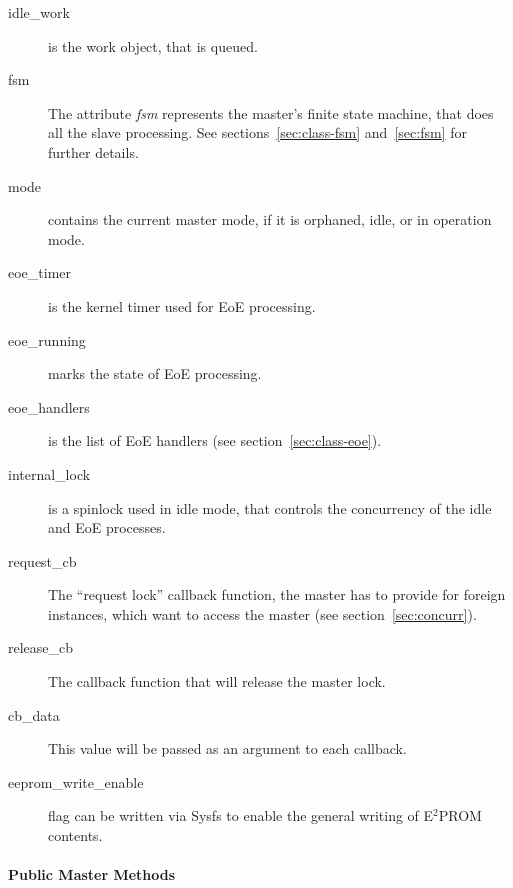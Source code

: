 \documentclass[a4paper,12pt,BCOR6mm,bibtotoc,idxtotoc]{scrbook}
\begin{document}
\begin{description}
\item[idle\_work] is the work object, that is queued.
\item[fsm] The attribute \textit{fsm} represents the master's finite
  state machine, that does all the slave processing. See
  sections~\ref{sec:class-fsm} and~\ref{sec:fsm} for further details.
\item[mode] contains the current master mode, if it is orphaned, idle,
  or in operation mode.
\item[eoe\_timer] is the kernel timer used for EoE
  processing.
\item[eoe\_running] marks the state of EoE processing.
\item[eoe\_handlers] is the list of EoE handlers (see
  section~\ref{sec:class-eoe}).
\item[internal\_lock] is a spinlock used in idle mode, that controls
  the concurrency of the idle and EoE processes.
\item[request\_cb] The ``request lock'' callback function, the master
  has to provide for foreign instances, which want to access the
  master (see section~\ref{sec:concurr}).
\item[release\_cb] The callback function that will release the master
  lock.
\item[cb\_data] This value will be passed as an argument to each
  callback.
\item[eeprom\_write\_enable] flag can be written via Sysfs to enable
  the general writing of E$^2$PROM contents.
\end{description}

\paragraph{Public Master Methods}
\end{document}
